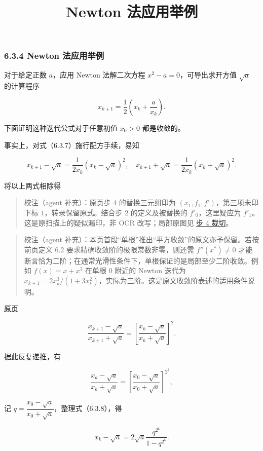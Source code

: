 \documentclass[
  10pt,
  fontset=fandol]{ctexart}
\title{Newton 法应用举例}
\author{}
\date{}
\begin{document}
\maketitle

\subsubsection{6.3.4 Newton 法应用举例}\label{newton-ux6cd5ux5e94ux7528ux4e3eux4f8b}

对于给定正数 \(a\)，应用 Newton 法解二次方程 \(x^2-a=0\)，可导出求开方值 \(\sqrt{a}\) 的计算程序

\[
x_{k+1}=\frac{1}{2}\left(x_k+\frac{a}{x_k}\right).
\tag{6.3.7}
\]

下面证明这种迭代公式对于任意初值 \(x_0>0\) 都是收敛的。

事实上，对式（6.3.7）施行配方手续，易知

\[
x_{k+1}-\sqrt{a}=\frac{1}{2x_k}(x_k-\sqrt{a})^2,\quad
x_{k+1}+\sqrt{a}=\frac{1}{2x_k}(x_k+\sqrt{a})^2.
\]

将以上两式相除得

\begin{quote}
校注（agent 补充）：原页步 4 的替换三元组印为 \((x_1,f_1,f')\)，第三项未印下标 \(1\)，转录保留原式。结合步 2 的定义及被替换的 \(f'_0\)，这里疑应为 \(f'_1\)。这是原扫描上的疑似漏印，非 OCR 改写；局部原图见 \href{../assets/ch06/detail-p165-step4.png}{步 4 裁切}。
\end{quote}

\begin{quote}
校注（agent 补充）：本页首段``单根''推出``平方收敛''的原文亦予保留。若按前页定义 6.2 要求精确收敛阶的极限常数非零，则还需 \(f''(x^*)\ne0\) 才能断言恰为二阶；在通常光滑性条件下，单根保证的是局部至少二阶收敛。例如 \(f(x)=x+x^3\) 在单根 \(0\) 附近的 Newton 迭代为 \(x_{k+1}=2x_k^3/(1+3x_k^2)\)，实际为三阶。这是原文收敛阶表述的适用条件说明。
\end{quote}

\href{../../source-images/pdf-166.jpeg}{原页}

\[
\frac{x_{k+1}-\sqrt{a}}{x_{k+1}+\sqrt{a}}=\left[\frac{x_k-\sqrt{a}}{x_k+\sqrt{a}}\right]^2.
\]

据此反复递推，有

\[
\frac{x_k-\sqrt{a}}{x_k+\sqrt{a}}=\left[\frac{x_0-\sqrt{a}}{x_0+\sqrt{a}}\right]^{2^k},
\tag{6.3.8}
\]

记 \(q=\dfrac{x_0-\sqrt{a}}{x_0+\sqrt{a}}\)，整理式（6.3.8），得

\[
x_k-\sqrt{a}=2\sqrt{a}\frac{q^{2^k}}{1-q^{2^k}}.
\]
\end{document}
